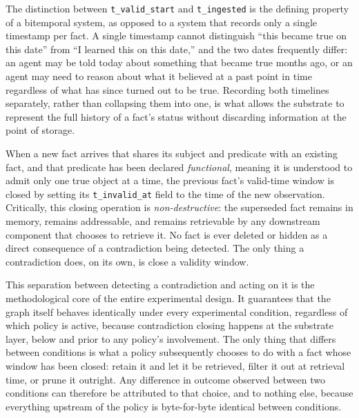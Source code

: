 The distinction between \texttt{t\_valid\_start} and \texttt{t\_ingested} is the defining property of a bitemporal system, as opposed to a system that records only a single timestamp per fact. A single timestamp cannot distinguish ``this became true on this date'' from ``I learned this on this date,'' and the two dates frequently differ: an agent may be told today about something that became true months ago, or an agent may need to reason about what it believed at a past point in time regardless of what has since turned out to be true. Recording both timelines separately, rather than collapsing them into one, is what allows the substrate to represent the full history of a fact's status without discarding information at the point of storage.

When a new fact arrives that shares its subject and predicate with an existing fact, and that predicate has been declared \emph{functional}, meaning it is understood to admit only one true object at a time, the previous fact's valid-time window is closed by setting its \texttt{t\_invalid\_at} field to the time of the new observation. Critically, this closing operation is \emph{non-destructive}: the superseded fact remains in memory, remains addressable, and remains retrievable by any downstream component that chooses to retrieve it. No fact is ever deleted or hidden as a direct consequence of a contradiction being detected. The only thing a contradiction does, on its own, is close a validity window.

This separation between detecting a contradiction and acting on it is the methodological core of the entire experimental design. It guarantees that the graph itself behaves identically under every experimental condition, regardless of which policy is active, because contradiction closing happens at the substrate layer, below and prior to any policy's involvement. The only thing that differs between conditions is what a policy subsequently chooses to do with a fact whose window has been closed: retain it and let it be retrieved, filter it out at retrieval time, or prune it outright. Any difference in outcome observed between two conditions can therefore be attributed to that choice, and to nothing else, because everything upstream of the policy is byte-for-byte identical between conditions.

